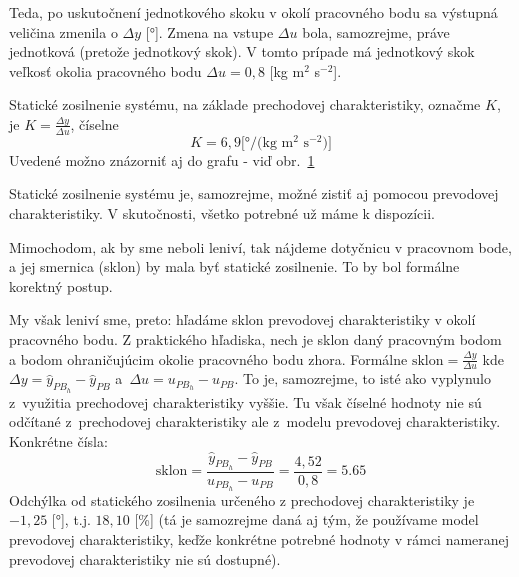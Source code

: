 \documentclass[a4paper, 10pt, ]{article}
\begin{document}
Teda, po uskutočnení jednotkového skoku v okolí pracovného bodu sa výstupná veličina zmenila o $\Delta y$ [°]. Zmena na vstupe $\Delta u$ bola, samozrejme, práve jednotková (pretože jednotkový skok). V tomto prípade má jednotkový skok veľkosť okolia pracovného bodu  $\Delta u = 0,8$ [kg m$^2$ s$^{-2}$].

Statické zosilnenie systému, na základe prechodovej charakteristiky, označme $K$, je $K = \frac{\Delta y}{\Delta u}$, číselne
\begin{equation}
     K = 6,9 \text{[°/(kg m$^2$ s$^{-2}$)]}
\end{equation}
Uvedené možno znázorniť aj do grafu - viď obr.~\ref{graf20}


\begin{figure}[t]
	\centering


    \vspace{-4mm}

	\caption{}
	\label{graf20}

\end{figure}



Statické zosilnenie systému je, samozrejme, možné zistiť aj pomocou prevodovej charakteristiky. V skutočnosti, všetko potrebné už máme k dispozícii.

Mimochodom, ak by sme neboli leniví, tak nájdeme dotyčnicu v pracovnom bode, a jej smernica (sklon) by mala byť statické zosilnenie. To by bol formálne korektný postup.

My však leniví sme, preto: hľadáme sklon prevodovej charakteristiky v okolí pracovného bodu. Z praktického hľadiska, nech je sklon daný pracovným bodom a bodom ohraničujúcim okolie pracovného bodu zhora. Formálne $\text{sklon} = \frac{\Delta y}{\Delta u}$ kde $\Delta y = \hat y_{PB_h} - \hat y_{PB}$ a~$\Delta u = u_{PB_h} - u_{PB}$. To je, samozrejme, to isté ako vyplynulo z~využitia prechodovej charakteristiky vyššie. Tu však číselné hodnoty nie sú odčítané z~prechodovej charakteristiky ale z~modelu prevodovej charakteristiky. Konkrétne čísla:
\begin{equation}
    \text{sklon} = \frac{\hat y_{PB_h} - \hat y_{PB}}{u_{PB_h} - u_{PB}} = \frac{4,52}{0,8} = 5.65
\end{equation}
Odchýlka od statického zosilnenia určeného z prechodovej charakteristiky je $-1,25$ [°], t.j. $18,10$ [\%] (tá je samozrejme daná aj tým, že používame model prevodovej charakteristiky, keďže konkrétne potrebné hodnoty v rámci nameranej prevodovej charakteristiky nie sú dostupné).
\end{document}
